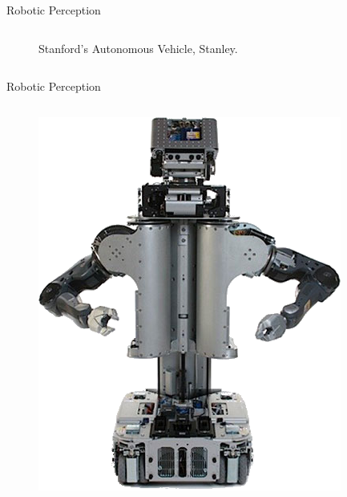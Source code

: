 \documentclass{beamer}
\newcommand\Fontsmall{\fontsize{6}{5}\selectfont}
\begin{document}
\begin{frame}{Robotic Perception}
\begin{columns}[T]
\begin{column}{.666\textwidth}
\begin{figure}
                \caption{Stanford's Autonomous Vehicle, Stanley. \Fontsmall{Image: Copyright David Stavens.}}
            \end{figure}
        \end{column}
  \end{columns} 
\end{frame}

\begin{frame}{Robotic Perception}
    \begin{columns}[T]
        \begin{column}{.333\textwidth}
            \begin{figure}
                \includegraphics[width=\textwidth]{Images/robot-interior.png}

\end{figure}
\end{column}
\end{columns}
\end{frame}
\end{document}
